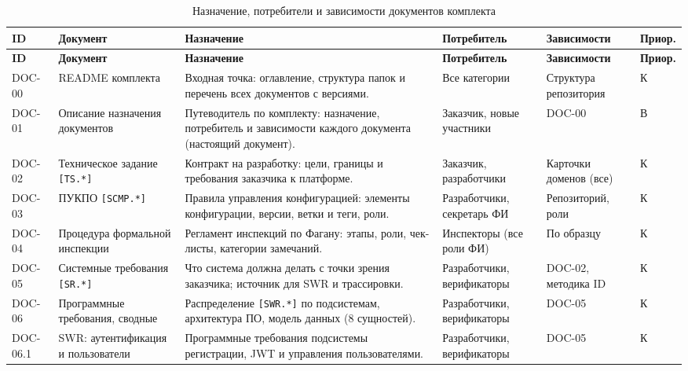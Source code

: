 \documentclass[12pt,a4paper]{article}
\begin{document}
{\small
\setlength{\tabcolsep}{3.5pt}
\begin{longtable}{>{\raggedright\arraybackslash}p{1.3cm} >{\raggedright\arraybackslash}p{2.7cm} >{\raggedright\arraybackslash}p{4.7cm} >{\raggedright\arraybackslash}p{2.4cm} >{\raggedright\arraybackslash}p{2.6cm} >{\centering\arraybackslash}p{0.7cm}}
\caption{Назначение, потребители и зависимости документов комплекта}
\label{tab:purpose-docs}\\
\toprule
\textbf{ID} & \textbf{Документ} & \textbf{Назначение} & \textbf{Потребитель} & \textbf{Зависимости} & \textbf{Приор.} \\
\midrule
\endfirsthead
\toprule
\textbf{ID} & \textbf{Документ} & \textbf{Назначение} & \textbf{Потребитель} & \textbf{Зависимости} & \textbf{Приор.} \\
\midrule
\endhead
\bottomrule
\endlastfoot
DOC-00 & README комплекта & Входная точка: оглавление, структура папок и перечень всех документов с версиями. & Все категории & Структура репозитория & К \\
DOC-01 & Описание назначения документов & Путеводитель по комплекту: назначение, потребитель и зависимости каждого документа (настоящий документ). & Заказчик, новые участники & DOC-00 & В \\
DOC-02 & Техническое задание \texttt{[TS.*]} & Контракт на разработку: цели, границы и требования заказчика к платформе. & Заказчик, разработчики & Карточки доменов (все) & К \\
DOC-03 & ПУКПО \texttt{[SCMP.*]} & Правила управления конфигурацией: элементы конфигурации, версии, ветки и теги, роли. & Разработчики, секретарь ФИ & Репозиторий, роли & К \\
DOC-04 & Процедура формальной инспекции & Регламент инспекций по Фагану: этапы, роли, чек-листы, категории замечаний. & Инспекторы (все роли ФИ) & По образцу & К \\
DOC-05 & Системные требования \texttt{[SR.*]} & Что система должна делать с точки зрения заказчика; источник для SWR и трассировки. & Разработчики, верификаторы & DOC-02, методика ID & К \\
DOC-06 & Программные требования, сводные & Распределение \texttt{[SWR.*]} по подсистемам, архитектура ПО, модель данных (8 сущностей). & Разработчики, верификаторы & DOC-05 & К \\
DOC-06.1 & SWR: аутентификация и пользователи & Программные требования подсистемы регистрации, JWT и управления пользователями. & Разработчики, верификаторы & DOC-05 & К \\

\end{longtable}}
\end{document}
